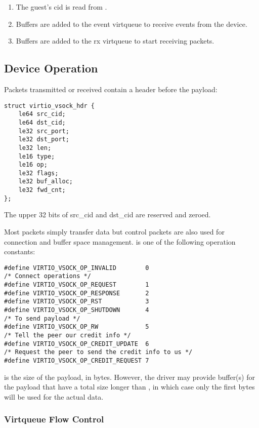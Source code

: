 \begin{enumerate}
\item The guest's cid is read from .

\item Buffers are added to the event virtqueue to receive events from the device.

\item Buffers are added to the rx virtqueue to start receiving packets.
\end{enumerate}

\subsection{Device Operation}\label{sec:Device Types / Socket Device / Device Operation}

Packets transmitted or received contain a header before the payload:

\begin{lstlisting}
struct virtio_vsock_hdr {
	le64 src_cid;
	le64 dst_cid;
	le32 src_port;
	le32 dst_port;
	le32 len;
	le16 type;
	le16 op;
	le32 flags;
	le32 buf_alloc;
	le32 fwd_cnt;
};
\end{lstlisting}

The upper 32 bits of src_cid and dst_cid are reserved and zeroed.

Most packets simply transfer data but control packets are also used for
connection and buffer space management.   is one of the following
operation constants:

\begin{lstlisting}
#define VIRTIO_VSOCK_OP_INVALID        0
/* Connect operations */
#define VIRTIO_VSOCK_OP_REQUEST        1
#define VIRTIO_VSOCK_OP_RESPONSE       2
#define VIRTIO_VSOCK_OP_RST            3
#define VIRTIO_VSOCK_OP_SHUTDOWN       4
/* To send payload */
#define VIRTIO_VSOCK_OP_RW             5
/* Tell the peer our credit info */
#define VIRTIO_VSOCK_OP_CREDIT_UPDATE  6
/* Request the peer to send the credit info to us */
#define VIRTIO_VSOCK_OP_CREDIT_REQUEST 7
\end{lstlisting}

 is the size of the payload, in bytes. However, the driver may
provide buffer(s) for the payload that have a total size longer than
, in which case only the first  bytes will be used for
the actual data.

\subsubsection{Virtqueue Flow Control}\label{sec:Device Types / Socket Device / Device Operation / Virtqueue Flow Control}

